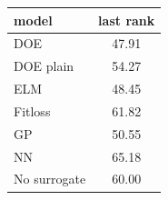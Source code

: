 \begin{tabular}{|lc|}
\hline
model & last rank\\
\hline
DOE & 47.91 \\
DOE plain & 54.27 \\
ELM & 48.45 \\
Fitloss & 61.82 \\
GP & 50.55 \\
NN & 65.18 \\
No surrogate & 60.00 \\
\hline
\end{tabular}
